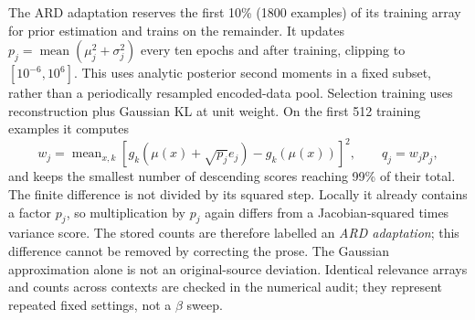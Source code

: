 \documentclass[make,article,submit,pdftex,moreauthors]{Definitions/mdpi}
\begin{document}
The ARD adaptation reserves the first 10\% (1800 examples) of its
training array for prior estimation and trains on the remainder.
It updates $p_j=\operatorname{mean}(\mu_j^2+\sigma_j^2)$ every ten
epochs and after training, clipping to $[10^{-6},10^6]$.
This uses analytic posterior second moments in a fixed subset, rather
than a periodically resampled encoded-data pool. Selection training uses
reconstruction plus Gaussian KL at unit weight. On the first 512
training examples it computes
\begin{equation}
 w_j=\operatorname{mean}_{x,k}
 [g_k(\mu(x)+\sqrt{p_j}e_j)-g_k(\mu(x))]^2,
 \qquad q_j=w_jp_j,
 \label{eq:ardlocal}
\end{equation}
and keeps the smallest number of descending scores reaching 99\% of
their total. The finite difference is not divided by its squared step.
Locally it already contains a factor $p_j$, so multiplication by $p_j$
again differs from a Jacobian-squared times variance score. The stored
counts are therefore labelled an \emph{ARD adaptation}; this difference
cannot be removed by correcting the prose. The Gaussian approximation
alone is not an original-source deviation. Identical relevance arrays
and counts across contexts are checked in the numerical audit; they
represent repeated fixed settings, not a $\beta$ sweep.
\end{document}
